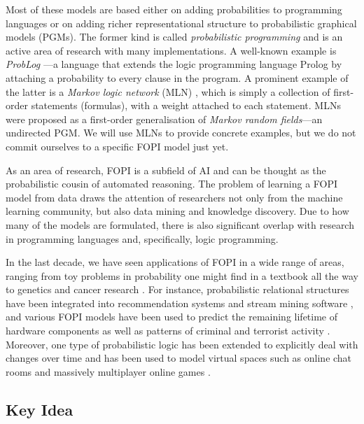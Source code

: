 \documentclass[11pt,english,twocolumn]{article}
\begin{document}
Most of these models are based either on adding probabilities to programming
languages or on adding richer representational structure to probabilistic
graphical models (PGMs). The former kind is called \emph{probabilistic
  programming} \cite{DBLP:conf/icse/GordonHNR14} and is an active area of
research with many implementations. A well-known example is \emph{ProbLog}
\cite{DBLP:conf/ijcai/RaedtKT07}---a language that extends the logic programming
language Prolog by attaching a probability to every clause in the program. A
prominent example of the latter is a \emph{Markov logic network} (MLN)
\cite{DBLP:journals/ml/RichardsonD06}, which is simply a collection of
first-order statements (formulas), with a weight attached to each statement.
MLNs were proposed as a first-order generalisation of \emph{Markov random
  fields}---an undirected PGM. We will use MLNs to provide concrete examples,
but we do not commit ourselves to a specific FOPI model just yet.

As an area of research, FOPI is a subfield of AI and can be thought as the
probabilistic cousin of automated reasoning. The problem of learning a FOPI
model from data draws the attention of researchers not only from the machine
learning community, but also data mining and knowledge discovery. Due to how
many of the models are formulated, there is also significant overlap with
research in programming languages and, specifically, logic programming.

In the last decade, we have seen applications of FOPI in a wide range of areas,
ranging from toy problems in probability one might find in a textbook
\cite{DBLP:conf/ijcai/DriesKDBR17} all the way to genetics
\cite{DBLP:journals/jcb/SakhanenkoG12} and cancer research
\cite{DBLP:conf/ilp/Corte-RealD017}. For instance, probabilistic relational
structures have been integrated into recommendation systems
\cite{DBLP:journals/corr/YangKAGN16} and stream mining software
\cite{DBLP:conf/icdm/ChandraSKTA14}, and various FOPI models have been used to
predict the remaining lifetime of hardware components
\cite{vlasselaer2012statistical} as well as patterns of criminal and terrorist
activity \cite{DBLP:conf/sdm/DelaneyFCWJ10}. Moreover, one type of probabilistic
logic has been extended to explicitly deal with changes over time and has been
used to model virtual spaces such as online chat rooms and massively multiplayer
online games \cite{DBLP:conf/pkdd/ThonLR08,DBLP:journals/ml/ThonLR11}.

\subsection*{Key Idea} %
\end{document}
